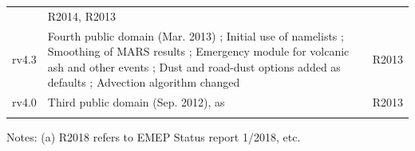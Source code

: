 \begin{table}
\begin{footnotesize}
\begin{tabular}{lp{11cm}l}
                  & R2014, R2013\\
rv4.3   & Fourth public domain (Mar. 2013)  %
       ; Initial use of namelists           %
       ; Smoothing of MARS results         %
       ; Emergency module for volcanic ash and other events%
       ; Dust and road-dust options added as defaults %
       ; Advection algorithm changed  %
             & R2013\\ 
rv4.0   & Third public domain (Sep. 2012), as \citet{Simpson:EMEP2012}            & R2013\\ 
        &                                                &\\
\hline
\end{tabular}
Notes: (a) R2018 refers to EMEP Status report 1/2018, etc.
\end{footnotesize}
\end{table}


\clearpage
\renewcommand\bibname{References}      %

